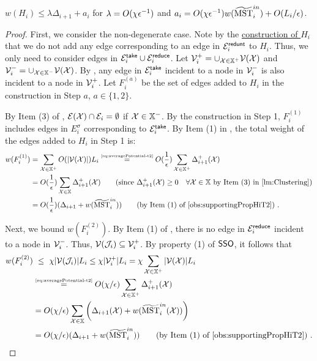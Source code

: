 \begin{lemma}\label{lm:Hi-WeightT2}  $w(H_i) \leq \lambda \Delta_{i+1} + a_i$ for $\lambda = O(\chi \epsilon^{-1} )$  and $a_i =   O(\chi \epsilon^{-1} )w(\widetilde{\mathrm{MST}}^{in}_i) + O(L_i/\epsilon)$.  
\end{lemma}
\begin{proof}  First, we consider the non-degenerate case. Note by the \hyperlink{HiConstT2}{construction of $H_i$} that we do not add any edge  corresponding to an edge in $\mathcal{E}^{\mathsf{redunt}}_i$ to $H_i$. Thus, we only need to consider edges in $\mathcal{E}^{\mathsf{take}}_i \cup \mathcal{E}^{\mathsf{reduce}}_i$. Let $\mathcal{V}_i^{+} = \cup_{\mathcal{X} \in \mathbb{X}^+}\mathcal{V}(\mathcal{X})$ and  $\mathcal{V}_i^{-} = \cup_{\mathcal{X} \in \mathbb{X}^-}\mathcal{V}(\mathcal{X})$. By , any edge in $\mathcal{E}^{\mathsf{take}}_i$ incident to a node in $\mathcal{V}_i^{-}$ is also incident to a node in $\mathcal{V}_i^{+}$.   Let $F^{(a)}_i$ be the set of edges added to $H_i$ in the construction in Step $a$, $a\in \{1,2\}$.
	
		By Item (3) of , $\mathcal{E}(\mathcal{X})\cap \mathcal{E}_i  = \emptyset$ if $\mathcal{X} \in \mathbb{X}^{-}$. By the construction in Step 1, $F^{(1)}_i$ includes edges in $E^{\sigma}_{i}$ corresponding to $\mathcal{E}_i^{\mathsf{take}}$. By Item (1) in , the total weight of the edges added to $H_i$ in Step 1 is:
	\begin{equation}\label{eq:Fi1T2}
		\begin{split}
			w(F^{(1)}_i)  &=  \sum_{\mx \in \mathbb{X}^{+}} O(|\mv(\mx)|) L_i \stackrel{\mbox{\tiny{\cref{eq:averagePotential-t2}}}}{=}  O(\frac{1}{\eps})\sum_{\mx \in \mathbb{X}^{+}} \Delta^+_{i+1}(\mx)\\
			&= O(\frac{1}{\eps})\sum_{\mx \in\mathbb{X}} \Delta^+_{i+1}(\mx)  \qquad \mbox{(since $\Delta^+_{i+1}(\mx)\geq 0 \quad \forall \mx \in \mathbb{X}$  by Item (3) in \Cref{lm:Clustering})} \\
			&= O(\frac{1}{\eps})(\Delta_{i+1} + w(\msttilde^{in}_i)) \qquad \mbox{(by Item (1) of \Cref{obs:supportingPropHiT2})}~.
		\end{split}
	\end{equation}   
	

	Next, we bound $w(F^{(2)}_i)$.  By Item (1) of , there is no edge in $\mathcal{E}^{\mathsf{reduce}}_i$ incident to a node in $\mathcal{V}_i^{-}$. Thus, $\mathcal{V}(\mathcal{J}_i) \subseteq \mathcal{V}_i^{+}$.	 By property (1) of \hyperlink{SPHigh}{$\mathsf{SSO}$}, it follows that
	\begin{equation}\label{eq:Fi3T2}
		\begin{split}
			w(F^{(2)}_i)  &~\leq~  \chi |\mv(\mathcal{J}_i)|  L_i \leq \chi|\mv_i^{+}| L_i =  \chi\sum_{\mx \in \mathbb{X}^{+}}|\mv(\mx)| L_i\\
			&\stackrel{\mbox{\tiny{\cref{eq:averagePotential-t2}}}}{=}  O(\chi/\eps)\sum_{\mx \in \mathbb{X}^{+}} \Delta^+_{i+1}(\mx)  \\   
			& =     O(\chi /\eps)\sum_{\mx \in \mathbb{X}} \left(\Delta_{i+1}(\mx) + w(\msttilde^{in}_i(\mx))\right)\\
			&= O(\chi/\eps)(\Delta_{i+1} + w(\msttilde^{in}_i)) \qquad \mbox{(by Item (1) of \Cref{obs:supportingPropHiT2})}~.
		\end{split}
	\end{equation} 
	

\end{proof}

